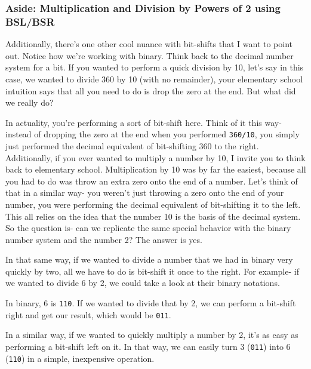 \documentclass[english, 10pt]{article}
\begin{document}
\subsubsection{Aside: Multiplication and Division by Powers of 2 using BSL/BSR}

Additionally, there's one other cool nuance with bit-shifts that I want to point out. Notice how we're working with binary. Think back to the decimal number system for a bit. If you wanted to perform a quick division by 10, let's say in this case, we wanted to divide 360 by 10 (with no remainder), your elementary school intuition says that all you need to do is drop the zero at the end. But what did we really do?\newline

In actuality, you're performing a sort of bit-shift here. Think of it this way- instead of dropping the zero at the end when you performed \texttt{360/10}, you simply just performed the decimal equivalent of bit-shifting 360 to the right. Additionally, if you ever wanted to multiply a number by 10, I invite you to think back to elementary school. Multiplication by 10 was by far the easiest, because all you had to do was throw an extra zero onto the end of a number. Let's think of that in a similar way- you weren't just throwing a zero onto the end of your number, you were performing the decimal equivalent of bit-shifting it to the left. This all relies on the idea that the number 10 is the basis of the decimal system. So the question is- can we replicate the same special behavior with the binary number system and the number 2? The answer is yes.\newline

In that same way, if we wanted to divide a number that we had in binary very quickly by two, all we have to do is bit-shift it once to the right. For example- if we wanted to divide 6 by 2, we could take a look at their binary notations.\newline

In binary, 6 is \texttt{110}. If we wanted to divide that by 2, we can perform a bit-shift right and get our result, which would be \texttt{011}.\newline

In a similar way, if we wanted to quickly multiply a number by 2, it's as easy as performing a bit-shift left on it. In that way, we can easily turn 3 (\texttt{011}) into 6 (\texttt{110}) in a simple, inexpensive operation.\newline
\end{document}
